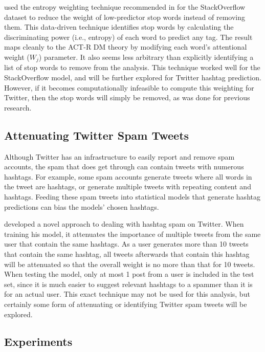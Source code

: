\documentclass[man,floatsintext,donotrepeattitle]{apa6}
\begin{document}
\textcite{Stanley2013} used the entropy weighting technique recommended in \textcite{Dumais1991} for the StackOverflow dataset to reduce the weight of low-predictor stop words instead of removing them.
This data-driven technique identifies stop words by calculating the discriminating power (i.e., entropy) of each word to predict any tag.
The result maps cleanly to the ACT-R DM theory by modifying each word's attentional weight ($W_{j}$) parameter.
It also seems less arbitrary than explicitly identifying a list of stop words to remove from the analysis.
This technique worked well for the StackOverflow model, and will be further explored for Twitter hashtag prediction.
However, if it becomes computationally infeasible to compute this weighting for Twitter, then the stop words will simply be removed, as was done for previous research.

\subsection{Attenuating Twitter Spam Tweets}

Although Twitter has an infrastructure to easily report and remove spam accounts, the spam that does get through can contain tweets with numerous hashtags.
For example, some spam accounts generate tweets where all words in the tweet are hashtags, or generate multiple tweets with repeating content and hashtags.
Feeding these spam tweets into statistical models that generate hashtag predictions can bias the models' chosen hashtags.

\textcite{Mazzia2009} developed a novel approach to dealing with hashtag spam on Twitter.
When training his model, it attenuates the importance of multiple tweets from the same user that contain the same hashtags.
As a user generates more than 10 tweets that contain the same hashtag, all tweets afterwards that contain this hashtag will be attenuated so that the overall weight is no more than that for 10 tweets.
When testing the model, only at most 1 post from a user is included in the test set, since it is much easier to suggest relevant hashtags to a spammer than it is for an actual user.
This exact technique may not be used for this analysis, but certainly some form of attenuating or identifying Twitter spam tweets will be explored.

\subsection{Experiments}
\end{document}

